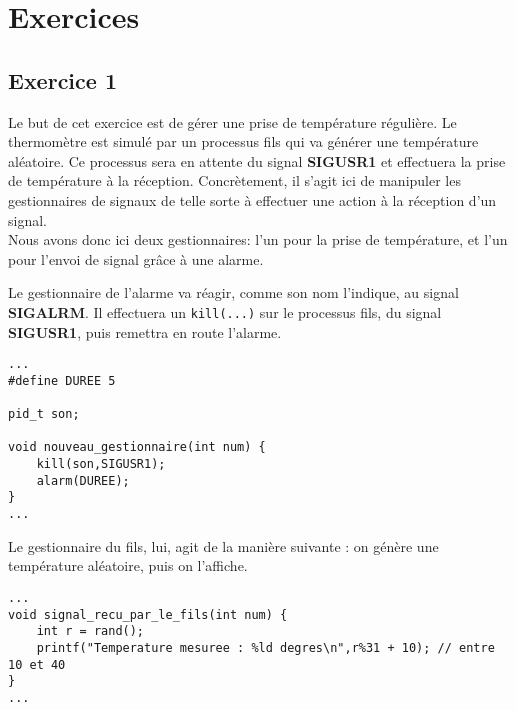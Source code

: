 \chapter{Exercices}

\clanguage

\section{Exercice 1}
Le but de cet exercice est de gérer une prise de température régulière. Le thermomètre est simulé par un processus fils qui va générer une température aléatoire. Ce processus sera en attente du signal \textbf{SIGUSR1} et effectuera la prise de température à la réception. Concrètement, il s'agit ici de manipuler les gestionnaires de signaux de telle sorte à effectuer une action à la réception d'un signal.\\
Nous avons donc ici deux gestionnaires: l'un pour la prise de température, et l'un pour l'envoi de signal grâce à une alarme.

\medskip

Le gestionnaire de l'alarme va réagir, comme son nom l'indique, au signal \textbf{SIGALRM}. Il effectuera un \lstinline{kill(...)} sur le processus fils, du signal \textbf{SIGUSR1}, puis \og{}remettra en route l'alarme\fg{}.

\begin{lstlisting}
...
#define DUREE 5

pid_t son;

void nouveau_gestionnaire(int num) {
    kill(son,SIGUSR1);
    alarm(DUREE);
}
...
\end{lstlisting}

\medskip

Le gestionnaire du fils, lui, agit de la manière suivante : on génère une température aléatoire, puis on l'affiche.

\begin{lstlisting}
...
void signal_recu_par_le_fils(int num) {
    int r = rand();
    printf("Temperature mesuree : %ld degres\n",r%31 + 10); // entre 10 et 40
}
...
\end{lstlisting}

\medskip

